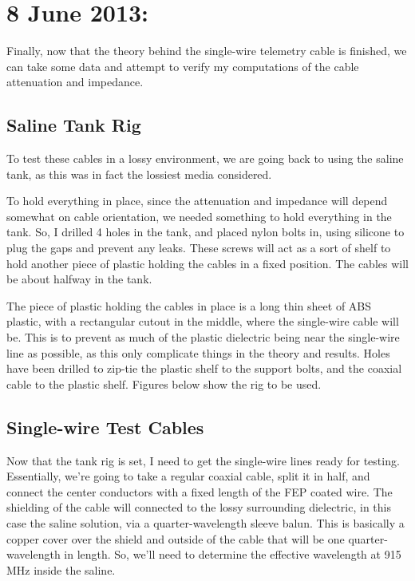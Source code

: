 \documentclass[12pt,onecolumn,titlepage]{article}
\begin{document}
\section{8 June 2013:}

\indent \indent Finally, now that the theory behind the single-wire telemetry cable is finished, we can take some data and attempt to verify my computations of the cable attenuation and impedance. 

\subsection{Saline Tank Rig}
\indent \indent To test these cables in a lossy environment, we are going back to using the saline tank, as this was in fact the lossiest media considered.

To hold everything in place, since the attenuation and impedance will depend somewhat on cable orientation, we needed something to hold everything in the tank. So, I drilled 4 holes in the tank, and placed nylon bolts in, using silicone to plug the gaps and prevent any leaks. These screws will act as a sort of shelf to hold another piece of plastic holding the cables in a fixed position. The cables will be about halfway in the tank.

The piece of plastic holding the cables in place is a long thin sheet of ABS plastic, with a rectangular cutout in the middle, where the single-wire cable will be. This is to prevent as much of the plastic dielectric being near the single-wire line as possible, as this only complicate things in the theory and results. Holes have been drilled to zip-tie the plastic shelf to the support bolts, and the coaxial cable to the plastic shelf. Figures below show the rig to be used.




\subsection{Single-wire Test Cables}
\indent \indent Now that the tank rig is set, I need to get the single-wire lines ready for testing. Essentially, we're going to take a regular coaxial cable, split it in half, and connect the center conductors with a fixed length of the FEP coated wire. The shielding of the cable will connected to the lossy surrounding dielectric, in this case the saline solution, via a quarter-wavelength sleeve balun. This is basically a copper cover over the shield and outside of the cable that will be one quarter-wavelength in length. So, we'll need to determine the effective wavelength at 915 MHz inside the saline.
\end{document}
